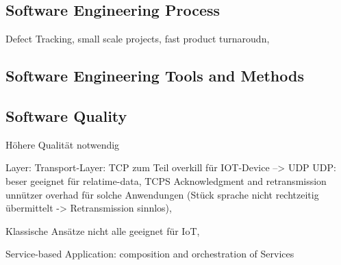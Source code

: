 \subsection{Software Engineering Process}
Defect Tracking, small scale projects, fast product turnaroudn, 

\subsection{Software Engineering Tools and Methods}


\subsection{Software Quality}
Höhere Qualität notwendig




Layer: Transport-Layer: TCP zum Teil overkill für IOT-Device --> UDP
UDP: beser geeignet für relatime-data, TCPS Acknowledgment and retransmission unnützer overhad für solche Anwendungen (Stück sprache nicht rechtzeitig übermittelt -> Retransmission sinnlos), 


Klassische Ansätze nicht alle geeignet für IoT, 

Service-based Application: composition and orchestration of Services